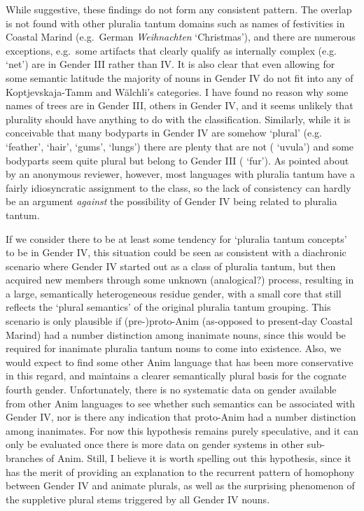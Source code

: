 \documentclass[output=collectionpaper]{langsci/langscibook}
\begin{document}
While suggestive, these findings do not form any consistent pattern. The overlap is not found with other pluralia tantum domains such as names of festivities in Coastal Marind (e.g.\ German \emph{Weihnachten} `Christmas'), and there are numerous exceptions, e.g.\ some artifacts that clearly qualify as internally complex (e.g.\  `net') are in Gender III rather than IV. It is also clear that \textendash{} even allowing for some semantic latitude \textendash{} the majority of nouns in Gender IV do not fit into any of Koptjevskaja-Tamm and W\"alchli's categories. I have found no reason why some names of trees are in Gender III, others in Gender IV, and it seems unlikely that plurality should have anything to do with the classification. Similarly, while it is conceivable that many bodyparts in Gender IV are somehow `plural' (e.g.\  `feather',  `hair',  `gums',  `lungs') there are plenty that are not ( `uvula')
and some bodyparts seem quite plural but belong to Gender III ( `fur'). As pointed about by an anonymous reviewer, however, most languages with pluralia tantum have a fairly idiosyncratic assignment to the class, so the lack of consistency can hardly be an argument \emph{against} the possibility of Gender IV being related to pluralia tantum.

If we consider there to be at least some tendency for `pluralia tantum concepts' to be in Gender IV, this situation could be seen as consistent with a diachronic scenario where Gender IV started out as a class of pluralia tantum, but then acquired new members through some unknown (analogical?) process, resulting in a large, semantically heterogeneous residue gender, with a small core that still reflects the `plural semantics' of the original pluralia tantum grouping. This scenario is only plausible if (pre-)proto-Anim (as-opposed to present-day Coastal Marind) had a number distinction among inanimate nouns, since this would be required for inanimate pluralia tantum nouns to come into existence. Also, we would expect to find some other Anim language that has been more conservative in this regard, and maintains a clearer semantically plural basis for the cognate fourth gender. Unfortunately, there is no systematic data on gender available from other Anim languages to see whether such semantics can be associated with Gender IV, nor is there any indication that proto-Anim had a number distinction among inanimates. For now this hypothesis remains purely speculative, and it can only be evaluated once there is more data on gender systems in other sub-branches of Anim. Still, I believe it is worth spelling out this hypothesis, since it has the merit of providing an explanation to the recurrent pattern of homophony between Gender IV and animate plurals, as well as the surprising phenomenon of the suppletive plural stems triggered by all Gender IV nouns.
\end{document}
